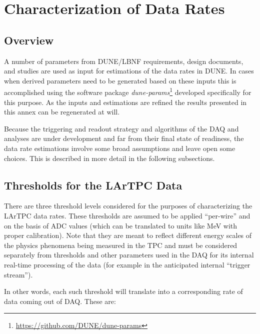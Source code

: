 \chapter{Characterization of Data Rates}
\label{ch:annex-rate}

\section{Overview}

A number of parameters from DUNE/LBNF requirements, design documents,  and studies are used  as input
for estimations of the data rates in DUNE. In cases when derived parameters need to be generated based on these inputs
this is accomplished using the software package \textit{dune-params}\footnote{\url{https://github.com/DUNE/dune-params}}
developed specifically for this purpose.
As the inputs and estimations are refined the results presented in
this annex can be regenerated at will.

Because the triggering and readout strategy and algorithms of the DAQ and
analyses are under development and far from their final state of readiness,
the data rate estimations involve some broad assumptions and leave open some choices.
This is described in more detail in the following subsections.



\section{Thresholds for the LArTPC Data}

There are three threshold levels considered for the purposes of characterizing the LArTPC data rates.
These thresholds are assumed to be applied ``per-wire'' and on the basis of ADC values (which can be translated
to units like MeV with proper calibration).
Note that they are meant to reflect different energy scales of the physics phenomena being
measured in the TPC and  must be considered separately from thresholds and other parameters used  in the
DAQ for its internal real-time processing of the data (for example in the anticipated internal ``trigger stream'').

In other words, each such threshold will translate into a corresponding rate of data coming out of DAQ. These are:

